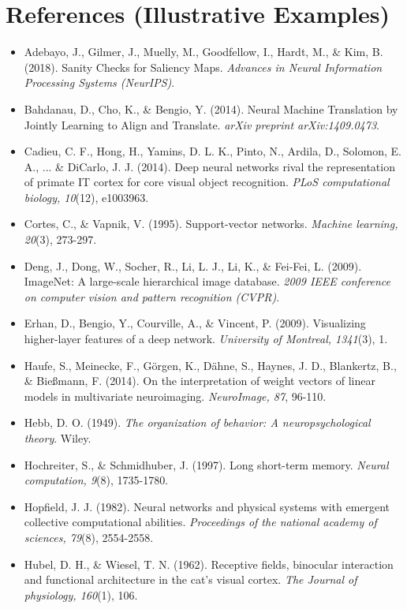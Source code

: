 \documentclass[11pt,a4paper]{article}
\begin{document}
\section*{References (Illustrative Examples)}
\begin{itemize}
    \item Adebayo, J., Gilmer, J., Muelly, M., Goodfellow, I., Hardt, M., \& Kim, B. (2018). Sanity Checks for Saliency Maps. \textit{Advances in Neural Information Processing Systems (NeurIPS)}.
    \item Bahdanau, D., Cho, K., \& Bengio, Y. (2014). Neural Machine Translation by Jointly Learning to Align and Translate. \textit{arXiv preprint arXiv:1409.0473}.
    \item Cadieu, C. F., Hong, H., Yamins, D. L. K., Pinto, N., Ardila, D., Solomon, E. A., ... \& DiCarlo, J. J. (2014). Deep neural networks rival the representation of primate IT cortex for core visual object recognition. \textit{PLoS computational biology, 10}(12), e1003963.
    \item Cortes, C., \& Vapnik, V. (1995). Support-vector networks. \textit{Machine learning, 20}(3), 273-297.
    \item Deng, J., Dong, W., Socher, R., Li, L. J., Li, K., \& Fei-Fei, L. (2009). ImageNet: A large-scale hierarchical image database. \textit{2009 IEEE conference on computer vision and pattern recognition (CVPR)}.
    \item Erhan, D., Bengio, Y., Courville, A., \& Vincent, P. (2009). Visualizing higher-layer features of a deep network. \textit{University of Montreal, 1341}(3), 1.
    \item Haufe, S., Meinecke, F., Görgen, K., Dähne, S., Haynes, J. D., Blankertz, B., \& Bießmann, F. (2014). On the interpretation of weight vectors of linear models in multivariate neuroimaging. \textit{NeuroImage, 87}, 96-110.
    \item Hebb, D. O. (1949). \textit{The organization of behavior: A neuropsychological theory}. Wiley.
    \item Hochreiter, S., \& Schmidhuber, J. (1997). Long short-term memory. \textit{Neural computation, 9}(8), 1735-1780.
    \item Hopfield, J. J. (1982). Neural networks and physical systems with emergent collective computational abilities. \textit{Proceedings of the national academy of sciences, 79}(8), 2554-2558.
    \item Hubel, D. H., \& Wiesel, T. N. (1962). Receptive fields, binocular interaction and functional architecture in the cat's visual cortex. \textit{The Journal of physiology, 160}(1), 106.

\end{itemize}
\end{document}
